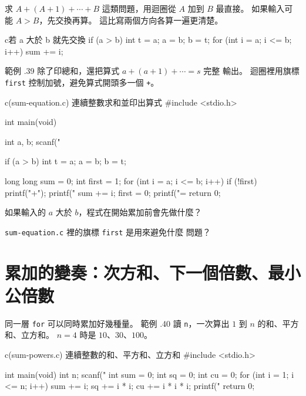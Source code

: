 求 $A + (A+1) + \cdots + B$ 這類問題，用迴圈從 $A$ 加到 $B$ 最直接。
如果輸入可能 $A > B$，先交換再算。 這比寫兩個方向各算一遍更清楚。

\begin{code}{c}{若 a 大於 b 就先交換}
if (a > b) {
    int t = a;
    a = b;
    b = t;
}
for (int i = a; i <= b; i++) {
    sum += i;
}
\end{code}

範例 \thechapter.39 除了印總和，還把算式 $a + (a+1) + \cdots = s$ 完整
輸出。 迴圈裡用旗標 \texttt{first} 控制加號，避免算式開頭多一個
\texttt{+}。

\begin{example}{c}{(sum-equation.c) 連續整數求和並印出算式}
#include <stdio.h>

int main(void) {
    int a, b;
    scanf("%

    if (a > b) {
        int t = a;
        a = b;
        b = t;
    }

    long long sum = 0;
    int first = 1;
    for (int i = a; i <= b; i++) {
        if (!first) {
            printf("+");
        }
        printf("%
        sum += i;
        first = 0;
    }
    printf("=%
    return 0;
}
\end{example}



\begin{drills}[label=drills:loop-range-sum]
\item 如果輸入的 $a$ 大於 $b$，程式在開始累加前會先做什麼？
\item \texttt{sum-equation.c} 裡的旗標 \texttt{first} 是用來避免什麼
問題？
\end{drills}

\section{累加的變奏：次方和、下一個倍數、最小公倍數}
\label{sec:loop-accum-variants}

同一層 \texttt{for} 可以同時累加好幾種量。 範例 \thechapter.40 讀
\texttt{n}，一次算出 $1$ 到 $n$ 的和、平方和、立方和。 $n = 4$ 時是
$10$、$30$、$100$。

\begin{example}{c}{(sum-powers.c) 連續整數的和、平方和、立方和}
#include <stdio.h>

int main(void) {
    int n;
    scanf("%
    int sum = 0;
    int sq = 0;
    int cu = 0;
    for (int i = 1; i <= n; i++) {
        sum += i;
        sq += i * i;
        cu += i * i * i;
    }
    printf("%
    return 0;
}
\end{example}

